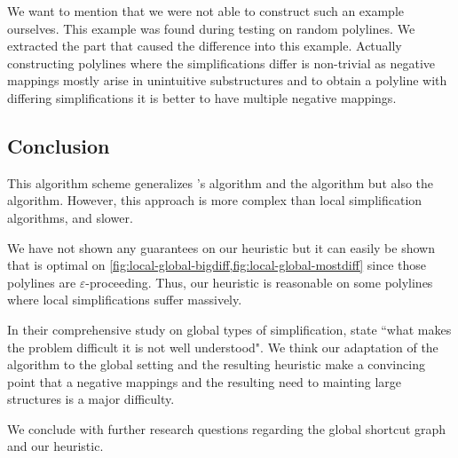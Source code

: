 We want to mention that we were not able to construct such an example ourselves. This example was found during testing on random polylines. We extracted the part that caused the difference into this example. Actually constructing polylines where the simplifications differ is non-trivial as negative mappings mostly arise in unintuitive substructures and to obtain a polyline with differing simplifications it is better to have multiple negative mappings.

\subsection{Conclusion}

This algorithm scheme generalizes \citeauthor{global_curve_simplification}'s algorithm and the \citeauthor{on_optimal_polyline_simplification_using_the_hausdorff_and_frechet_distance} algorithm but also the \citeauthor{computational_geometric_methods_for_polygonal_approximations_of_a_curve} algorithm. However, this approach is more complex than local simplification algorithms, and slower.

We have not shown any guarantees on our heuristic but it can easily be shown that is optimal on \cref{fig:local-global-bigdiff,fig:local-global-mostdiff} since those polylines are \(\varepsilon\)-proceeding. Thus, our heuristic is reasonable on some polylines where local simplifications suffer massively.

In their comprehensive study on global types of simplification, \citeauthor{global_curve_simplification} state ``what makes the problem difficult it is not well understood". We think our adaptation of the \citeauthor{computational_geometric_methods_for_polygonal_approximations_of_a_curve} algorithm to the global setting and the resulting heuristic make a convincing point that a negative mappings and the resulting need to mainting large structures is a major difficulty.

We conclude with further research questions regarding the global shortcut graph and our heuristic.

